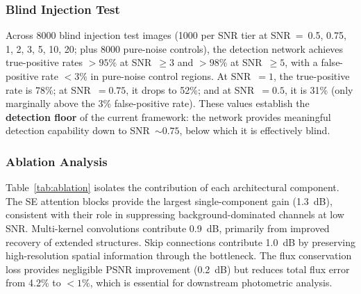 \documentclass[preprint2]{aastex631}
\begin{document}
\subsubsection{Blind Injection Test}

Across 8000 blind injection test images (1000 per SNR tier at SNR~=~0.5, 0.75, 1, 2, 3, 5, 10, 20; plus 8000 pure-noise controls), the detection network achieves true-positive rates $>95\%$ at SNR~$\geq 3$ and $>98\%$ at SNR~$\geq 5$, with a false-positive rate $<3\%$ in pure-noise control regions. At SNR~$=1$, the true-positive rate is 78\%; at SNR~$=0.75$, it drops to 52\%; and at SNR~$=0.5$, it is 31\% (only marginally above the 3\% false-positive rate). These values establish the \textbf{detection floor} of the current framework: the network provides meaningful detection capability down to SNR~$\sim 0.75$, below which it is effectively blind.

\subsubsection{Ablation Analysis}\label{sec:ablation}

Table~\ref{tab:ablation} isolates the contribution of each architectural component. The SE attention blocks provide the largest single-component gain (1.3~dB), consistent with their role in suppressing background-dominated channels at low SNR. Multi-kernel convolutions contribute 0.9~dB, primarily from improved recovery of extended structures. Skip connections contribute 1.0~dB by preserving high-resolution spatial information through the bottleneck. The flux conservation loss provides negligible PSNR improvement (0.2~dB) but reduces total flux error from 4.2\% to $<1\%$, which is essential for downstream photometric analysis.
\end{document}
